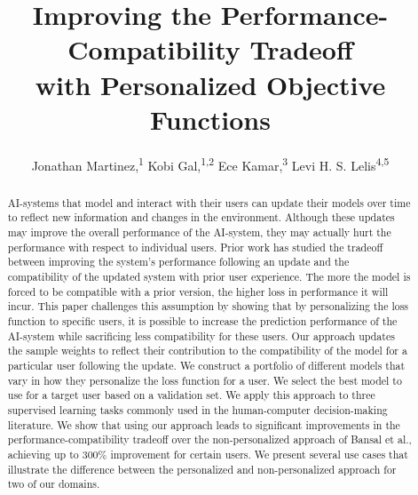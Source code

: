 \documentclass[letterpaper]{article} %
\theoremstyle{definition}
\begin{document}
\title{Improving the Performance-Compatibility Tradeoff \\ with Personalized Objective Functions}

\author{
Jonathan Martinez,\textsuperscript{\rm 1}
Kobi Gal,\textsuperscript{\rm 1,2}
Ece Kamar,\textsuperscript{\rm 3}
Levi H. S. Lelis\textsuperscript{\rm 4,5}
\\
}

\maketitle


\begin{abstract}
AI-systems that model and interact with their users can update their models over time to reflect new information and changes in the environment. Although these updates may improve the overall performance of the AI-system, they may actually hurt the performance with respect to individual users. Prior work has studied the tradeoff between improving the system's performance following an update and the compatibility of the updated system with prior user experience. The more the model is forced to be compatible with a prior version, the higher loss in performance it will incur. This paper  challenges this assumption by showing  that by
personalizing the loss function to specific users, it is possible to  increase the  prediction performance of the AI-system   while sacrificing  less   compatibility for these users.   Our approach updates the  sample weights  to reflect their contribution to the compatibility of the model  for a particular user following the update. We construct a portfolio of
different models that vary in how they personalize the loss function for a user. We select  the  best model
to use  for  a  target user based on a validation set.
We apply this approach to three supervised learning tasks commonly used in the human-computer decision-making literature. We show that using our approach leads to     significant improvements in the performance-compatibility tradeoff  over the  non-personalized approach of Bansal et al., achieving up to 300\% improvement    for certain users.  We present several use cases that illustrate the difference between the personalized and
non-personalized approach for two of our domains.
\end{abstract}
\end{document}
